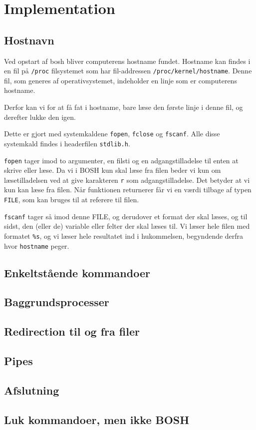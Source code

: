 \section{Implementation}
\subsection{Hostnavn}
Ved opstart af bosh bliver computerens hostname fundet. Hostname kan findes i en fil på \texttt{/proc} filsystemet som har fil-addressen \texttt{/proc/kernel/hostname}. Denne fil, som generes af operativsystemet, indeholder en linje som er computerens hostname.

Derfor kan vi for at få fat i hostname, bare læse den første linje i denne fil, og derefter lukke den igen.

Dette er gjort med systemkaldene \texttt{fopen}, \texttt{fclose} og \texttt{fscanf}. Alle disse systemkald findes i headerfilen \texttt{stdlib.h}.

\texttt{fopen} tager imod to argumenter, en filsti og en adgangstilladelse til enten at skrive eller læse. Da vi i BOSH kun skal læse fra filen beder vi kun om læsetilladelsen ved at give karakteren \texttt{r} som adgangstilladelse. Det betyder at vi kun kan læse fra filen. Når funktionen returnerer får vi en værdi tilbage af typen \texttt{FILE}, som kan bruges til at referere til filen.

\texttt{fscanf} tager så imod denne FILE, og derudover et format der skal læses, og til sidst, den (eller de) variable eller felter der skal læses til. Vi læser hele filen med formatet \texttt{\%s}, og vi læser hele resultatet ind i hukommelsen, begyndende derfra hvor \texttt{hostname} peger.

\subsection{Enkeltstående kommandoer}
\subsection{Baggrundsprocesser}
\subsection{Redirection til og fra filer}
\subsection{Pipes}
\subsection{Afslutning}
\subsection{Luk kommandoer, men ikke BOSH}
